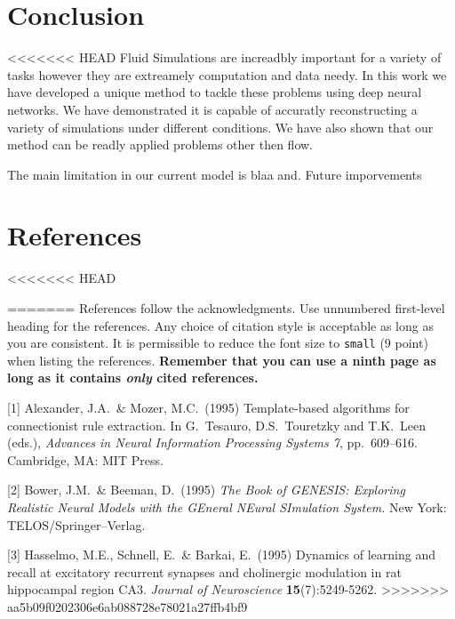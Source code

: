 \documentclass{article}
\begin{document}
\section{Conclusion}

<<<<<<< HEAD
Fluid Simulations are increadbly important for a variety of tasks however they are extreamely computation and data needy. In this work we have developed a unique method to tackle these problems using deep neural networks. We have demonstrated it is capable of accuratly reconstructing a variety of simulations under different conditions. We have also shown that our method can be readly applied problems other then flow.

The main limitation in our current model is blaa and. Future imporvements 


\section*{References}

<<<<<<< HEAD


=======
References follow the acknowledgments. Use unnumbered first-level
heading for the references. Any choice of citation style is acceptable
as long as you are consistent. It is permissible to reduce the font
size to \verb+small+ (9 point) when listing the references. {\bf
  Remember that you can use a ninth page as long as it contains
  \emph{only} cited references.}
\medskip

\small

[1] Alexander, J.A.\ \& Mozer, M.C.\ (1995) Template-based algorithms
for connectionist rule extraction. In G.\ Tesauro, D.S.\ Touretzky and
T.K.\ Leen (eds.), {\it Advances in Neural Information Processing
  Systems 7}, pp.\ 609--616. Cambridge, MA: MIT Press.

[2] Bower, J.M.\ \& Beeman, D.\ (1995) {\it The Book of GENESIS:
  Exploring Realistic Neural Models with the GEneral NEural SImulation
  System.}  New York: TELOS/Springer--Verlag.

[3] Hasselmo, M.E., Schnell, E.\ \& Barkai, E.\ (1995) Dynamics of
learning and recall at excitatory recurrent synapses and cholinergic
modulation in rat hippocampal region CA3. {\it Journal of
  Neuroscience} {\bf 15}(7):5249-5262.
>>>>>>> aa5b09f0202306e6ab088728e78021a27ffb4bf9
\end{document}
